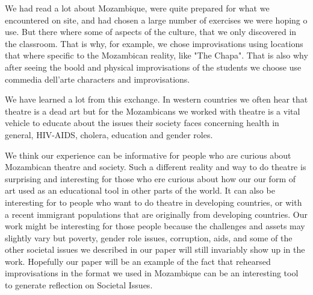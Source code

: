 \documentclass[article,twocolumn,twoside]{memoir}
\begin{document}
We had read a lot about Mozambique, were quite prepared for what we encountered
on site, and had chosen a large number of exercises we were hoping o use. But
there where some of aspects of the culture, that we only discovered in the
classroom. That is why, for example, we chose improvisations using locations
that where specific to the Mozambican reality, like "The Chapa". That is also
why after seeing the boold and physical improvisations of the students we choose
use commedia dell'arte characters and improvisations.

We have learned a lot from this exchange. In western countries we often hear
that theatre is a dead art but for the Mozambicans we worked with theatre is a
vital vehicle to educate about the issues their society faces concerning
health in general, HIV-AIDS, cholera, education and gender roles. 

We think our experience can be informative for people who are curious about
Mozambican theatre and society. Such a different reality and way to do theatre
is surprising and interesting for those who ere curious about how our our form
of art used as an educational tool in other parts of the world. It can also be
interesting for to people who want to do theatre in developing countries, or
with a recent immigrant populations that are originally from developing countries.
Our work might be interesting for those people because the challenges and assets
may slightly vary but poverty, gender role issues, corruption, aids, and some
of the other societal issues we described in our paper will still invariably
show up in the work. Hopefully our paper will be an example of the fact that
rehearsed improvisations in the format we used in Mozambique can be an
interesting tool to generate reflection on Societal Issues.
\end{document}
